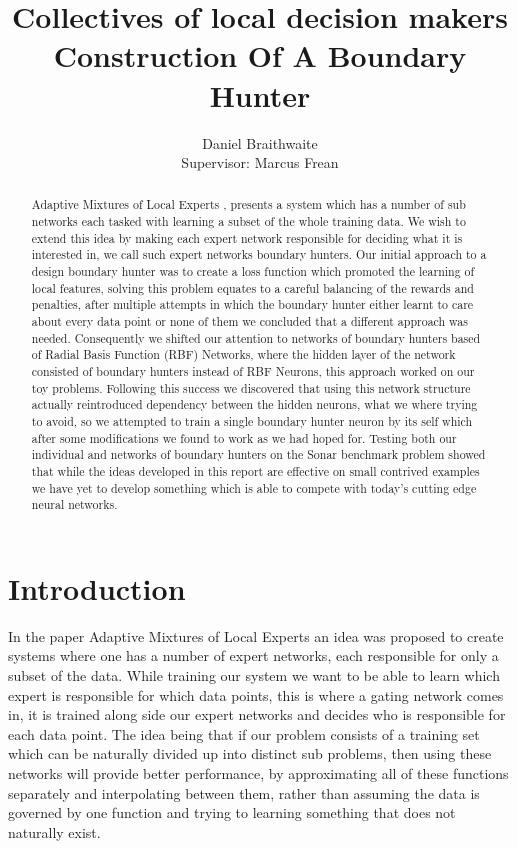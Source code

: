 \documentclass[notitlepage]{report}
\title{%
	Collectives of local decision makers\\
	\large Construction Of A Boundary Hunter
}
\author{Daniel Braithwaite\\[1cm] {Supervisor: Marcus Frean}}
\theoremstyle{definition}
\begin{document}
\begin{titlingpage}
    \maketitle
    \begin{abstract}
    Adaptive Mixtures of Local Experts \cite{jacobs1991adaptive}, presents a system which has a number of sub networks each tasked with learning a subset of the whole training data. We wish to extend this idea by making each expert network responsible for deciding what it is interested in, we call such expert networks boundary hunters. Our initial approach to a design boundary hunter was to create a loss function which promoted the learning of local features, solving this problem equates to a careful balancing of the rewards and penalties, after multiple attempts in which the boundary hunter either learnt to care about every data point or none of them we concluded that a different approach was needed. Consequently we shifted our attention to networks of boundary hunters based of Radial Basis Function (RBF) Networks, where the hidden layer of the network consisted of boundary hunters instead of RBF Neurons, this approach worked on our toy problems. Following this success we discovered that using this network structure actually reintroduced dependency between the hidden neurons, what we where trying to avoid, so we attempted to train a single boundary hunter neuron by its self which after some modifications we found to work as we had hoped for. Testing both our individual and networks of boundary hunters on the Sonar benchmark problem showed that while the ideas developed in this report are effective on small contrived examples we have yet to develop something which is able to compete with today's cutting edge neural networks.
    \end{abstract}
\end{titlingpage}

\chapter{Introduction}

In the paper Adaptive Mixtures of Local Experts \cite{jacobs1991adaptive} an idea was proposed to create systems where one has a number of expert networks, each responsible for only a subset of the data. While training our system we want to be able to learn which expert is responsible for which data points, this is where a gating network comes in, it is trained along side our expert networks and decides who is responsible for each data point. The idea being that if our problem consists of a training set which can be naturally divided up into distinct sub problems, then using these networks will provide better performance, by approximating all of these functions separately and interpolating between them, rather than assuming the data is governed by one function and trying to learning something that does not naturally exist.\\
\end{document}
